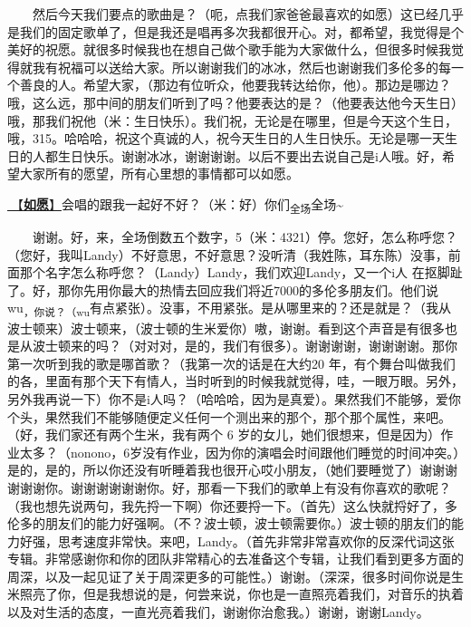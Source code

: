 \documentclass[]{ctexbook}
\begin{document}
  然后今天我们要点的歌曲是？（呃，点我们家爸爸最喜欢的如愿）这已经几乎是我们的固定歌单了，但是我还是唱再多次我都很开心。对，都希望，我觉得是个美好的祝愿。就很多时候我也在想自己做个歌手能为大家做什么，但很多时候我觉得就我有祝福可以送给大家。所以谢谢我们的冰冰，然后也谢谢我们多伦多的每一个善良的人。希望大家，（那边有位听众，他要我转达给你，他）。那边是哪边？哦，这么远，那中间的朋友们听到了吗？他要表达的是？（他要表达他今天生日）哦，那我们祝他（米：生日快乐）。我们祝，无论是在哪里，但是今天这个生日， 哦，315。哈哈哈，祝这个真诚的人，祝今天生日的人生日快乐。无论是哪一天生日的人都生日快乐。谢谢冰冰，谢谢谢谢。以后不要出去说自己是i人哦。好，希望大家所有的愿望，所有心里想的事情都可以如愿。

\hyperref[As-you-wish]{🎵【\textbf{如愿}】}会唱的跟我一起好不好？（米：好）你们\textsubscript{全场}全场\textasciitilde{}

  谢谢。好，来，全场倒数五个数字，5（米：4321）停。您好，怎么称呼您？（您好，我叫Landy）不好意思，不好意思？没听清（我姓陈，耳东陈）没事，前面那个名字怎么称呼您？（Landy）Landy，我们欢迎Landy，又一个i人 在抠脚趾了。好，那你先用你最大的热情去回应我们将近7000的多伦多朋友们。他们说wu\textsubscript{，你说？（wu}有点紧张）。没事，不用紧张。是从哪里来的？还是就是？（我从波士顿来）波士顿来，（波士顿的生米爱你）嗷，谢谢。看到这个声音是有很多也是从波士顿来的吗？（对对对，是的，我们有很多）。谢谢谢谢，谢谢谢谢。那你第一次听到我的歌是哪首歌？（我第一次的话是在大约20 年，有个舞台叫做我们的各，里面有那个天下有情人，当时听到的时候我就觉得，哇，一眼万眼。另外，另外我再说一下）你不是i人吗？（哈哈哈，因为是真爱）。果然我们不能够，爱你个头，果然我们不能够随便定义任何一个测出来的那个，那个那个属性，来吧。（好，我们家还有两个生米，我有两个 6 岁的女儿，她们很想来，但是因为）作业太多？（nonono，6岁没有作业，因为你的演唱会时间跟他们睡觉的时间冲突。）是的，是的，所以你还没有听睡着我也很开心哎小朋友，（她们要睡觉了）谢谢谢谢谢谢你。谢谢谢谢谢谢你。好，那看一下我们的歌单上有没有你喜欢的歌呢？（我也想先说两句，我先捋一下啊）你还要捋一下。（首先）这么快就捋好了，多伦多的朋友们的能力好强啊。（不？波士顿，波士顿需要你。）波士顿的朋友们的能力好强，思考速度非常快。来吧，Landy。（首先非常非常喜欢你的反深代词这张专辑。非常感谢你和你的团队非常精心的去准备这个专辑，让我们看到更多方面的周深，以及一起见证了关于周深更多的可能性。）谢谢。（深深，很多时间你说是生米照亮了你，但是我想说的是，何尝来说，你也是一直照亮着我们，对音乐的执着以及对生活的态度，一直光亮着我们，谢谢你治愈我。）谢谢，谢谢Landy。
\end{document}
